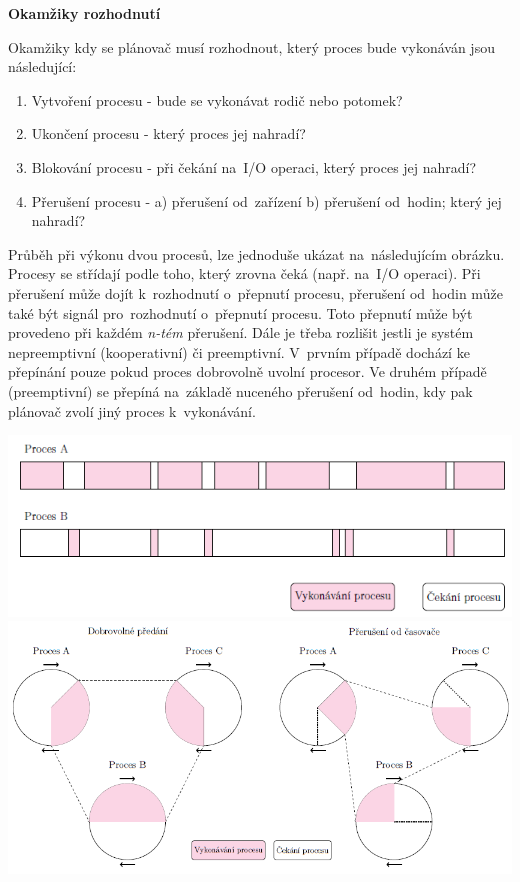 \begin{Large}
    \vspace{0,5cm}
    \textbf{Okamžiky rozhodnutí}
\end{Large}

Okamžiky kdy se plánovač musí rozhodnout, který proces bude vykonáván jsou následující:
\begin{enumerate}
    \item Vytvoření procesu - bude se vykonávat rodič nebo potomek?
    \item Ukončení procesu - který proces jej nahradí?
    \item Blokování procesu - při čekání na~I/O operaci, který proces jej nahradí?
    \item Přerušení procesu - a) přerušení od~zařízení b) přerušení od~hodin; který jej nahradí?
\end{enumerate}

Průběh při výkonu dvou procesů, lze jednoduše ukázat na~následujícím obrázku. Procesy se střídají podle toho, který zrovna čeká (např. na~I/O operaci). Při přerušení může dojít k~rozhodnutí o~přepnutí procesu, přerušení od~hodin může také být signál pro~rozhodnutí o~přepnutí procesu. Toto přepnutí může být provedeno při každém \emph{n-tém} přerušení. 
\vspace{0,5cm}
Dále je třeba rozlišit jestli je systém nepreemptivní (kooperativní) či preemptivní. V~prvním případě dochází ke přepínání pouze pokud proces dobrovolně uvolní procesor. Ve druhém případě (preemptivní) se přepíná na~základě nuceného přerušení od~hodin, kdy pak plánovač zvolí jiný proces k~vykonávání. 

\begin{center}
    \includegraphics[scale=1]{images/proc_changing.png}
    \includegraphics[scale=1]{images/proc_preemption.png}
\end{center}

